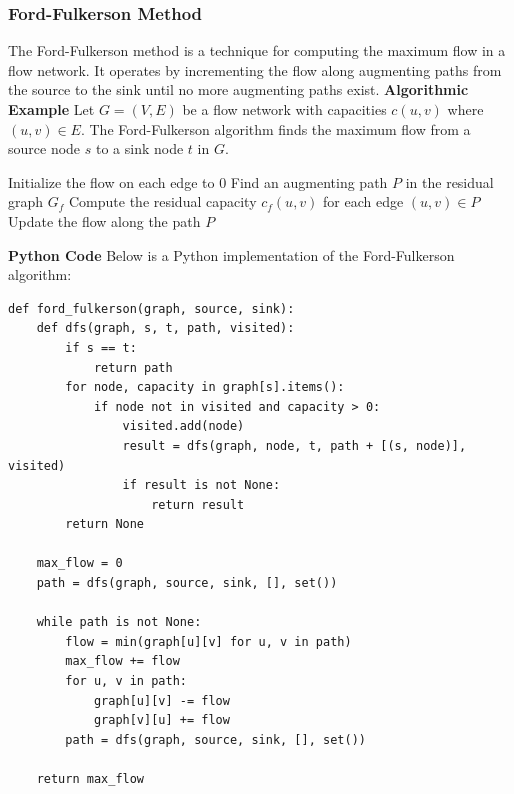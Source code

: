 \documentclass[12pt]{book} %
\begin{document}
\subsubsection{Ford-Fulkerson Method}
The Ford-Fulkerson method is a technique for computing the maximum flow in a flow network. It operates by incrementing the flow along augmenting paths from the source to the sink until no more augmenting paths exist.
\FloatBarrier
\textbf{Algorithmic Example}
\FloatBarrier
Let $G = (V, E)$ be a flow network with capacities $c(u, v)$ where $(u, v) \in E$. The Ford-Fulkerson algorithm finds the maximum flow from a source node $s$ to a sink node $t$ in $G$.
\FloatBarrier
\begin{algorithm}
\caption{Ford-Fulkerson Algorithm}
\begin{algorithmic}
\State Initialize the flow on each edge to 0
    \State Find an augmenting path $P$ in the residual graph $G_f$
    \State Compute the residual capacity $c_f(u, v)$ for each edge $(u, v) \in P$
    \State Update the flow along the path $P$
\EndWhile
\end{algorithmic}
\end{algorithm}
\FloatBarrier
\textbf{Python Code}
\FloatBarrier
Below is a Python implementation of the Ford-Fulkerson algorithm:
\FloatBarrier
\begin{lstlisting}
def ford_fulkerson(graph, source, sink):
    def dfs(graph, s, t, path, visited):
        if s == t:
            return path
        for node, capacity in graph[s].items():
            if node not in visited and capacity > 0:
                visited.add(node)
                result = dfs(graph, node, t, path + [(s, node)], visited)
                if result is not None:
                    return result
        return None
    
    max_flow = 0
    path = dfs(graph, source, sink, [], set())
    
    while path is not None:
        flow = min(graph[u][v] for u, v in path)
        max_flow += flow
        for u, v in path:
            graph[u][v] -= flow
            graph[v][u] += flow
        path = dfs(graph, source, sink, [], set())
    
    return max_flow
\end{lstlisting}
\end{document}
